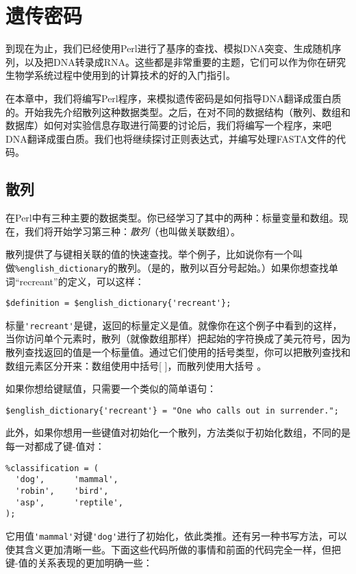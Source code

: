 \chapter{遗传密码}
\label{chap:chapter8}
\minitoc

到现在为止，我们已经使用Perl进行了基序的查找、模拟DNA突变、生成随机序列，以及把DNA转录成RNA。这些都是非常重要的主题，它们可以作为你在研究生物学系统过程中使用到的计算技术的好的入门指引。

在本章中，我们将编写Perl程序，来模拟遗传密码是如何指导DNA翻译成蛋白质的。开始我先介绍散列这种数据类型。之后，在对不同的数据结构（散列、数组和数据库）如何对实验信息存取进行简要的讨论后，我们将编写一个程序，来吧DNA翻译成蛋白质。我们也将继续探讨正则表达式，并编写处理FASTA文件的代码。

\section{散列}
在Perl中有三种主要的数据类型。你已经学习了其中的两种：标量变量和数组。现在，我们将开始学习第三种：\textit{散列}（也叫做关联数组）。

散列提供了与键相关联的值的快速查找。举个例子，比如说你有一个叫做\verb|%english_dictionary|的散列。（是的，散列以百分号起始。）如果你想查找单词“recreant”的定义，可以这样：

\begin{lstlisting}
$definition = $english_dictionary{'recreant'};
\end{lstlisting}

标量\verb|'recreant'|是键，返回的标量定义是值。就像你在这个例子中看到的这样，当你访问单个元素时，散列（就像数组那样）把起始的字符换成了美元符号，因为散列查找返回的值是一个标量值。通过它们使用的括号类型，你可以把散列查找和数组元素区分开来：数组使用中括号[ ]，而散列使用大括号{ }。

如果你想给键赋值，只需要一个类似的简单语句：

\begin{lstlisting}
$english_dictionary{'recreant'} = "One who calls out in surrender.";
\end{lstlisting}

此外，如果你想用一些键值对初始化一个散列，方法类似于初始化数组，不同的是每一对都成了键-值对：

\begin{lstlisting}
%classification = (
  'dog',      'mammal',
  'robin',    'bird',
  'asp',      'reptile',
);
\end{lstlisting}

它用值\verb|'mammal'|对键\verb|'dog'|进行了初始化，依此类推。还有另一种书写方法，可以使其含义更加清晰一些。下面这些代码所做的事情和前面的代码完全一样，但把键-值的关系表现的更加明确一些：

